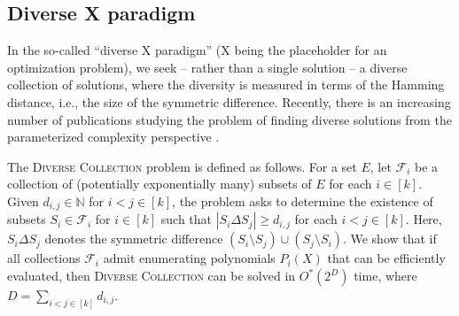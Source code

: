 \documentclass[10pt,a4paper]{article}
\newcommand{\N}{\ensuremath{\mathbb N}\xspace}
\newcommand{\cF}{\ensuremath{\mathcal F}\xspace}
\begin{document}
\subsection{Diverse X paradigm} \label{sec:diverse}


In the so-called ``diverse X paradigm'' (X being the placeholder for an optimization problem), we seek -- rather than a single solution -- a diverse collection of solutions, where the diversity is measured in terms of the Hamming distance, i.e., the size of the symmetric difference.
Recently, there is an increasing number of publications studying the problem of finding diverse solutions from the parameterized complexity perspective \cite{BasteFJMOPR22,BasteJMPR19,FominGJPS24,FominGPPS24,HanakaKKO21}.

The \textsc{Diverse Collection} problem is defined as follows.
For a set $E$, let $\cF_i$ be a collection of (potentially exponentially many) subsets of $E$ for each $i \in [k]$.
Given $d_{i,j} \in \N$ for $i < j \in [k]$, the problem asks to determine the existence of subsets $S_i \in \cF_i$ for $i \in [k]$ such that $|S_i \Delta S_j| \ge d_{i,j}$ for each $i < j \in [k]$.
Here, $S_i \Delta S_j$ denotes the symmetric difference $(S_i \setminus S_j) \cup (S_j \setminus S_i)$.
We show that if all collections $\cF_i$ admit enumerating polynomials $P_i(X)$ that can be efficiently evaluated, then \textsc{Diverse Collection} can be solved in $O^*(2^D)$ time, where $D = \sum_{i < j \in [k]} d_{i,j}$.
\end{document}
